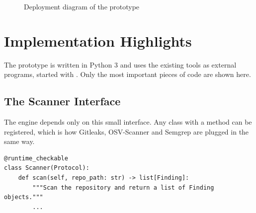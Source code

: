 \documentclass[12pt,a4paper]{article}
\newcommand{\code}[1]{\texttt{\detokenize{#1}}}
\begin{document}
\begin{figure}[H]
{}
\caption{Deployment diagram of the prototype}
\label{fig:deployment}
\end{figure}
\section{Implementation Highlights}

The prototype is written in Python 3 and uses the existing tools as external programs, started with \code{subprocess}. Only the most important pieces of code are shown here.

\subsection{The Scanner Interface}

The engine depends only on this small interface. Any class with a \code{scan} method can be registered, which is how Gitleaks, OSV-Scanner and Semgrep are plugged in the same way.

\begin{lstlisting}[caption={The \code{Scanner} protocol (engine/security\_engine.py)},label={lst:scanner}]
@runtime_checkable
class Scanner(Protocol):
    def scan(self, repo_path: str) -> list[Finding]:
        """Scan the repository and return a list of Finding objects."""
        ...
\end{lstlisting}
\end{document}
